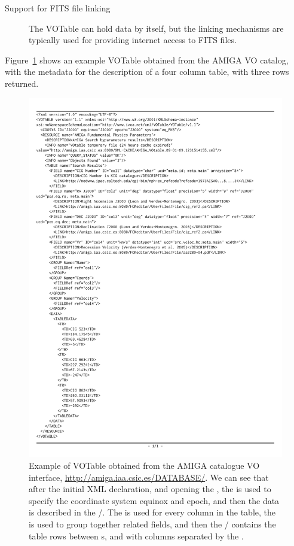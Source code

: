 \begin{description}
				 \item[Support for FITS file linking] The VOTable
				can hold data by itself, but the linking mechanisms
				are typically used for providing internet access to
				FITS files.
			\end{description}
			
			Figure~\ref{fig:fig_amiga-vot} shows an example VOTable
			obtained from the AMIGA VO catalog, with the metadata
			for the description of a four column table, with three
			rows returned.
			
			\begin{figure}[tbp]
				\centering
					\includegraphics[height=0.787\textheight]
					{fig/amiga-vot.pdf}
				\caption[VOTable example]{
					Example of VOTable obtained from the AMIGA
					catalogue VO interface,
					\url{http://amiga.iaa.csic.es/DATABASE/}. We
					can see that after the initial XML declaration,
					and opening the , the
					 is used to specify the
					coordinate system equinox and epoch, and then
					the data is described in the
					/. The
					 is used for every column in the
					table, the  is used to group
					together related fields, and then the
					/ contains the
					table rows between s, and with
					columns separated by the .
				}
				\label{fig:fig_amiga-vot}
			\end{figure}
					
